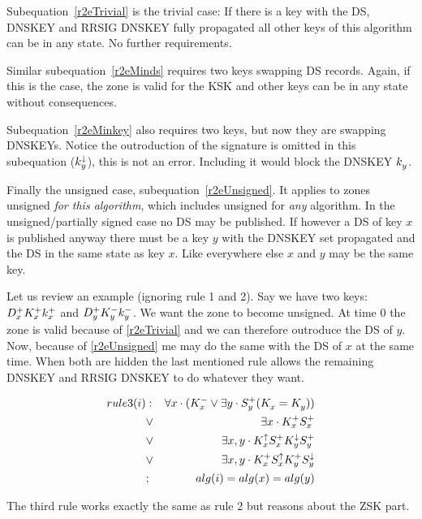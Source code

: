 \documentclass[twoside, a4paper]{article}
\begin{document}
Subequation~\eqref{r2eTrivial} is the trivial case: If there is a key with the DS, DNSKEY and RRSIG DNSKEY fully propagated all other keys of this algorithm can be in any state. No further requirements.

Similar subequation~\eqref{r2eMinds} requires two keys swapping DS records. Again, if this is the case, the zone is valid for the KSK and other keys can be in any state without consequences.

Subequation~\eqref{r2eMinkey} also requires two keys, but now they are swapping DNSKEYs. Notice the outroduction of the signature is omitted in this subequation ($k_{y}^{\downarrow}$), this is not an error. Including it would block the DNSKEY $k_{y}^{}$.

Finally the unsigned case, subequation~\eqref{r2eUnsigned}. It applies to zones unsigned \emph{for this algorithm}, which includes unsigned for \emph{any} algorithm. In the unsigned/partially signed case no DS may be published. If however a DS of key $x$ is published anyway there must be a key $y$ with the DNSKEY set propagated and the DS in the same state as key $x$. Like everywhere else $x$ and $y$ may be the same key.

Let us review an example (ignoring rule 1 and 2). Say we have two keys: $D_{x}^{+}K_{x}^{+}k_{x}^{+}$ and $D_{y}^{+}K_{y}^{-}k_{y}^{-}$. We want the zone to become unsigned. At time 0 the zone is valid because of \eqref{r2eTrivial} and we can therefore outroduce the DS of $y$. Now, because of \eqref{r2eUnsigned} me may do the same with the DS of $x$ at the same time. When both are hidden the last mentioned rule allows the remaining DNSKEY and RRSIG DNSKEY to do whatever they want.

\begin{subequations}
\label{eqn:rule3Expl}
\begin{align}
rule3(i)
&:&		\forall x \cdot (K_{x}^{-} \vee \exists y \cdot S_{y}^{+} (K_{x}^{}=K_{y}^{}) ) \\
&\vee&	\exists x\cdot K_{x}^{+} S_{x}^{+} \\
&\vee&	\exists x,y\cdot K_{x}^{\uparrow} S_{x}^{+} K_{y}^{\downarrow} S_{y}^{+} \\
&\vee&	\exists x,y\cdot K_{x}^{+} S_{x}^{\uparrow} K_{y}^{+} S_{y}^{\downarrow} \\
&;&		alg(i)=alg(x)=alg(y)
\end{align}
\end{subequations}

The third rule works exactly the same as rule 2 but reasons about the ZSK part. 
\end{document}
